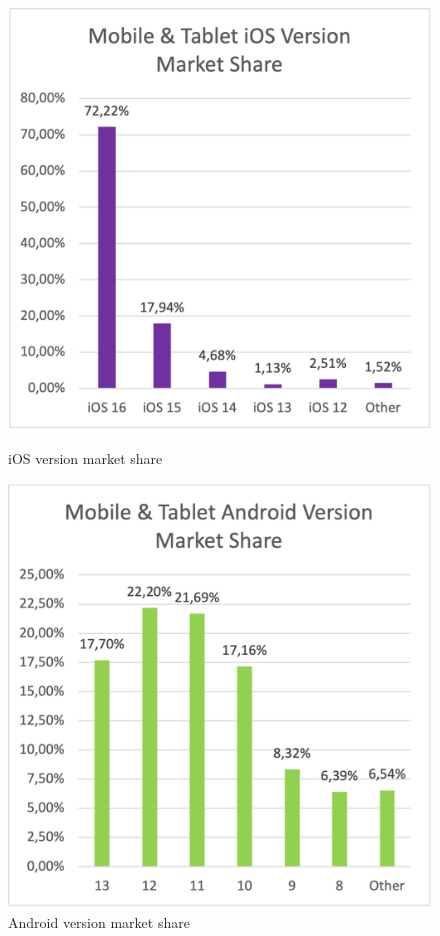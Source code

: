 \begin{figure}[H]
    \begin{minipage}{.47\textwidth}
      \includegraphics[width=\textwidth]{img/ios_ver_market_share}
      \caption{iOS version market share \cite{statcounter_ios_version_market}}
      \label{fig:ios_versions}
    \end{minipage}
    \hfill
    \begin{minipage}{.47\textwidth}
      \includegraphics[width=\textwidth]{img/android_ver_market_share}
      \caption{Android version market share \cite{statcounter_android_version_market}}
      \label{fig:android_versions}
    \end{minipage}
\end{figure}

